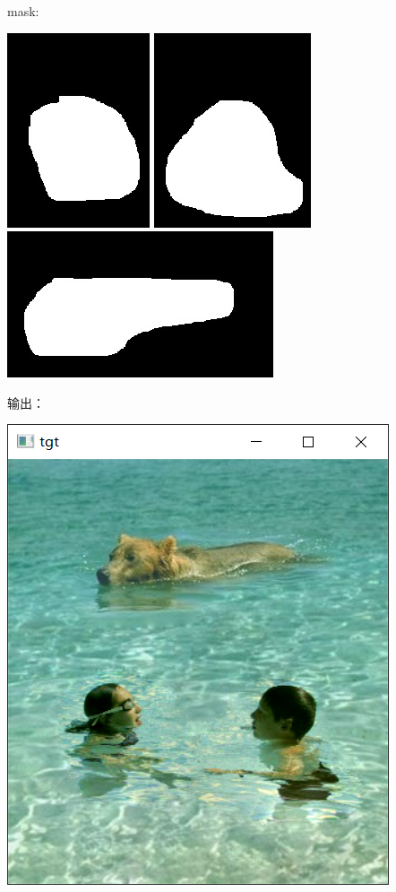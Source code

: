 \documentclass[12pt, a4paper, oneside]{report}
\begin{document}
	\noindent mask: 
	
	\centerline{
		\includegraphics[scale=0.3]{mask1.jpg}
		\includegraphics[scale=0.3]{mask2.jpg}
		\includegraphics[scale=0.43]{mask3.jpg}
	}

	\noindent 输出：
	
	\centerline{	
	\includegraphics[scale=0.25]{Output1.png}
}
	
\end{document}
